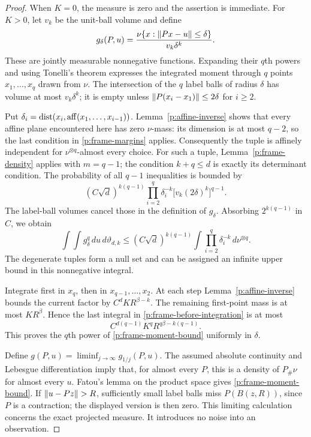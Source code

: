 \begin{proof}
When \(K=0\), the measure is zero and the assertion is immediate.
For \(K>0\), let \(v_k\) be the unit-ball volume and define
\[
 g_\delta(P,u)=\frac{\nu\{x:\left\lVert Px-u\right\rVert\le\delta\}}{v_k\delta^k}.
\]
These are jointly measurable nonnegative functions. Expanding their
\(q\)th powers and using Tonelli's theorem expresses the integrated
moment through \(q\) points \(x_1,\ldots,x_q\) drawn from \(\nu\).
The intersection of the \(q\) label balls of radius \(\delta\) has
volume at most \(v_k\delta^k\); it is empty unless
\(\left\lVert P(x_i-x_1)\right\rVert\le2\delta\) for \(i\ge2\).

Put
\(\delta_i=\operatorname{dist}(x_i,\operatorname{aff}(x_1,\ldots,x_{i-1}))\).
Lemma~\ref{p:affine-inverse} shows that every affine plane encountered
here has zero \(\nu\)-mass: its dimension is at most \(q-2\), so the
last condition in \eqref{p:frame-margins} applies. Consequently the tuple
is affinely independent for \(\nu^{\otimes q}\)-almost every choice.
For such a tuple, Lemma~\ref{p:frame-density} applies with \(m=q-1\);
the condition \(k+q\le d\) is exactly its determinant condition. The
probability of all \(q-1\) inequalities is bounded by
\[
 (C\sqrt d)^{k(q-1)}
 \prod_{i=2}^q\delta_i^{-k}
 \bigl[v_k(2\delta)^k\bigr]^{q-1}.
\]
The label-ball volumes cancel those in the definition of \(g_\delta\).
Absorbing \(2^{k(q-1)}\) in \(C\), we obtain
\begin{equation}\label{p:frame-before-integration}
 \int\!\!\int g_\delta^q\,du\,d\vartheta_{d,k}
 \le (C\sqrt d)^{k(q-1)}
 \int\prod_{i=2}^q\delta_i^{-k}\,d\nu^{\otimes q}.
\end{equation}
The degenerate tuples form a null set and can be assigned an infinite
upper bound in this nonnegative integral.

Integrate first in \(x_q\), then in \(x_{q-1},\ldots,x_2\).
At each step Lemma~\ref{p:affine-inverse} bounds the current factor by
\(C^d K R^{\beta-k}\). The remaining first-point mass is at most
\(KR^\beta\). Hence the last integral in
\eqref{p:frame-before-integration} is at most
\[
 C^{d(q-1)}K^qR^{q\beta-k(q-1)}.
\]
This proves the \(q\)th power of \eqref{p:frame-moment-bound} uniformly
in \(\delta\).

Define \(g(P,u)=\liminf_{j\to\infty}g_{1/j}(P,u)\). The assumed absolute
continuity and Lebesgue differentiation
\cite[Theorem~1.6.19, pp.~146--147]{TaoMeasure2011} imply that, for almost every
\(P\), this is a density of \(P_\#\nu\) for almost every \(u\).
Fatou's lemma on the product space
\cite[Corollary~1.4.47, p.~110]{TaoMeasure2011} gives
\eqref{p:frame-moment-bound}. If \(\left\lVert u-Pz\right\rVert>R\), sufficiently small
label balls miss \(P(B(z,R))\), since \(P\) is a contraction; the
displayed version is then zero. This limiting calculation concerns the
exact projected measure. It introduces no noise into an observation.
\end{proof}


